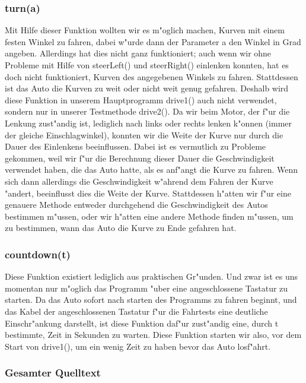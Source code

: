\documentclass[a4paper,12pt]{article}
\begin{document}
\subsubsection{turn(a)}\label{sec2.2.6}

Mit Hilfe dieser Funktion wollten wir es m"oglich machen, Kurven mit einem festen Winkel zu fahren, dabei w"urde dann der Parameter a den Winkel in Grad angeben.
Allerdings hat dies nicht ganz funktioniert; auch wenn wir ohne Probleme mit Hilfe von steerLeft() und steerRight() einlenken konnten, hat es doch nicht funktioniert, Kurven des angegebenen Winkels zu fahren.
Stattdessen ist das Auto die Kurven zu weit oder nicht weit genug gefahren.
Deshalb wird diese Funktion in unserem Hauptprogramm drive1() auch nicht verwendet, sondern nur in unserer Testmethode drive2().
Da wir beim Motor, der f"ur die Lenkung zust"andig ist, lediglich nach links oder rechts lenken k"onnen (immer der gleiche Einschlagwinkel), konnten wir die Weite der Kurve nur durch die Dauer des Einlenkens beeinflussen.
Dabei ist es vermutlich zu Probleme gekommen, weil wir f"ur die Berechnung dieser Dauer die Geschwindigkeit verwendet haben, die das Auto hatte, als es anf"angt die Kurve zu fahren.
Wenn sich dann allerdings die Geschwindigkeit w"ahrend dem Fahren der Kurve "andert, beeinflusst dies die Weite der Kurve.
Stattdessen h"atten wir f"ur eine genauere Methode entweder durchgehend die Geschwindigkeit des Autos bestimmen m"ussen, oder wir h"atten eine andere Methode finden m"ussen, um zu bestimmen, wann das Auto die Kurve zu Ende gefahren hat.

\subsubsection{countdown(t)}\label{sec2.2.7}

Diese Funktion existiert lediglich aus praktischen Gr"unden.
Und zwar ist es uns momentan nur m"oglich das Programm "uber eine angeschlossene Tastatur zu starten.
Da das Auto sofort nach starten des Programms zu fahren beginnt, und das Kabel der angeschlossenen Tastatur f"ur die Fahrtests eine deutliche Einschr"ankung darstellt, ist diese Funktion daf"ur zust"andig eine, durch t bestimmte, Zeit in Sekunden zu warten.
Diese Funktion starten wir also, vor dem Start von drive1(), um ein wenig Zeit zu haben bevor das Auto losf"ahrt.

\subsubsection{Gesamter Quelltext}\label{sec2.2.8}

\end{document}

